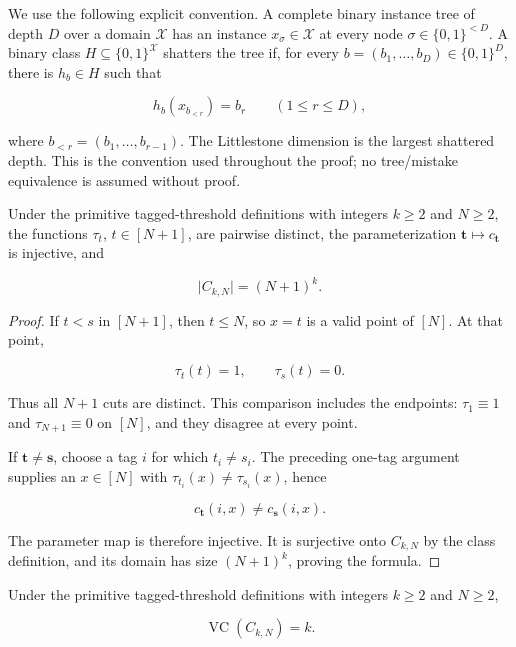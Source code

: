 We use the following explicit convention. A complete binary instance tree of depth \(D\) over a domain \(\mathcal X\) has an instance \(x_\sigma\in\mathcal X\) at every node \(\sigma\in\{0,1\}^{<D}\). A binary class \(H\subseteq\{0,1\}^{\mathcal X}\) shatters the tree if, for every \(b=(b_1,\ldots,b_D)\in\{0,1\}^D\), there is \(h_b\in H\) such that

\[
h_b(x_{b_{<r}})=b_r\qquad(1\le r\le D),
\]

where \(b_{<r}=(b_1,\ldots,b_{r-1})\). The Littlestone dimension is the largest shattered depth. This is the convention used throughout the proof; no tree/mistake equivalence is assumed without proof.

\begin{lemma}\label{lem:step-001-cardinality}
Under the primitive tagged-threshold definitions with integers \(k\ge2\) and \(N\ge2\), the functions \(\tau_t\), \(t\in[N+1]\), are pairwise distinct, the parameterization \(\boldsymbol t\mapsto c_{\boldsymbol t}\) is injective, and

\[
\lvert C_{k,N}\rvert=(N+1)^k.
\]
\end{lemma}

\begin{proof}
If \(t<s\) in \([N+1]\), then \(t\le N\), so \(x=t\) is a valid point of \([N]\). At that point,

\[
\tau_t(t)=1,\qquad \tau_s(t)=0.
\]

Thus all \(N+1\) cuts are distinct. This comparison includes the endpoints: \(\tau_1\equiv1\) and \(\tau_{N+1}\equiv0\) on \([N]\), and they disagree at every point.

If \(\boldsymbol t\ne\boldsymbol s\), choose a tag \(i\) for which \(t_i\ne s_i\). The preceding one-tag argument supplies an \(x\in[N]\) with \(\tau_{t_i}(x)\ne\tau_{s_i}(x)\), hence

\[
c_{\boldsymbol t}(i,x)\ne c_{\boldsymbol s}(i,x).
\]

The parameter map is therefore injective. It is surjective onto \(C_{k,N}\) by the class definition, and its domain has size \((N+1)^k\), proving the formula. \end{proof}

\begin{lemma}\label{lem:step-001-vc}
Under the primitive tagged-threshold definitions with integers \(k\ge2\) and \(N\ge2\),

\[
\operatorname{VC}(C_{k,N})=k.
\]
\end{lemma}

